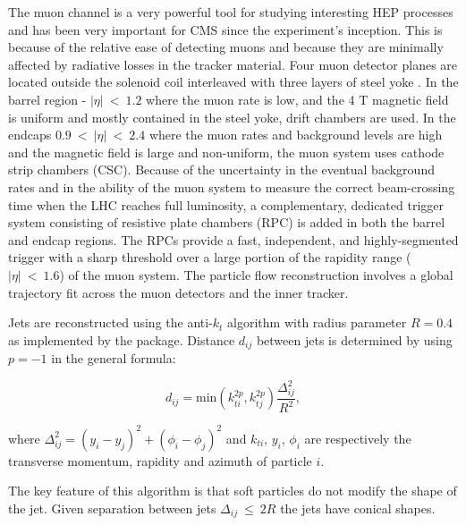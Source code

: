 The muon channel is a very powerful tool for studying interesting HEP processes and has been very important for CMS since the experiment's inception. This is because of the relative ease of detecting muons and because they are minimally affected by radiative losses in the tracker material. Four muon detector planes are located outside the solenoid coil interleaved with three layers of steel yoke \cite{muon_tech_rep}. In the barrel region - $\left|\eta\right|\ <\ 1.2$ where the muon rate is low, and the 4 T magnetic field is uniform and mostly contained in the steel yoke, drift chambers are used. In the endcaps $0.9\ <\ \left|\eta\right|\ <\ 2.4$ where the muon rates and background levels are high and the magnetic field is large and non-uniform, the muon system uses cathode strip chambers (CSC). Because of the uncertainty in the eventual background rates and in the ability of the muon system to measure the correct beam-crossing time when the LHC reaches full luminosity, a complementary, dedicated trigger system consisting of resistive plate chambers (RPC) is added in both the barrel and endcap regions.  The RPCs provide a fast, independent, and highly-segmented trigger with a sharp \pt threshold over a large portion of the rapidity range ($\left|\eta\right|\ <\ 1.6$) of the muon system. The particle flow reconstruction involves a global trajectory fit across the muon detectors and the inner tracker. 

Jets are reconstructed using the anti-$k_{t}$ algorithm \cite{Cacciari:2008gp} with radius parameter $R=0.4$ as implemented by the \FASTJET \cite{Cacciari:2011ma} package. Distance $d_{ij}$ between jets is determined by using $p=-1$ in the general formula:

\begin{equation}
d_{ij}=\text{min}(k_{ti}^{2p}, k_{tj}^{2p})\frac{\Delta_{ij}^{2}}{R^{2}},
\end{equation}

where $\Delta_{ij}^{2}=(y_{i}-y_{j})^{2}+(\phi_{i}-\phi_{j})^{2}$ and $k_{ti}$, $y_{i}$, $\phi_{i}$ are respectively the transverse momentum, rapidity and azimuth of particle $i$. 

The key feature of this algorithm is that soft particles do not modify the shape of the jet. Given separation between jets $\Delta_{ij}\ \leq\ 2R$ the jets have conical shapes. 
